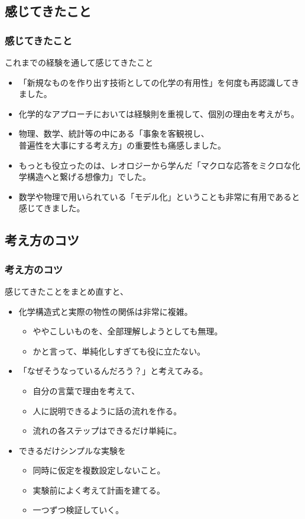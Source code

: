 \documentclass[unicode,12pt]{beamer}%
\begin{document}
\subsection{感じてきたこと}
\begin{frame}
	\frametitle{感じてきたこと}
		\begin{alertblock}{これまでの経験を通して感じてきたこと}
			\begin{itemize}
				\item 「新規なものを作り出す技術としての\alert{化学の有用性}」を何度も再認識してきました。
				\item 化学的なアプローチにおいては経験則を重視して、個別の理由を考えがち。
				\item 物理、数学、統計等の中にある「\alert{事象を客観視し、\\普遍性を大事}にする考え方」の重要性も痛感しました。
				\item もっとも役立ったのは、レオロジーから学んだ「\alert{マクロな応答をミクロな化学構造へと繋げる想像力}」でした。
				\item 数学や物理で用いられている「\alert{モデル化}」ということも非常に有用であると感じてきました。
			\end{itemize}
		\end{alertblock}
\end{frame}

\subsection{考え方のコツ}
\begin{frame}
	\frametitle{考え方のコツ}
		\begin{block}{感じてきたことをまとめ直すと、}
			\begin{itemize}
				\item 化学構造式と実際の物性の関係は非常に複雑。
				\begin{itemize}
					\item ややこしいものを、全部理解しようとしても無理。
					\item かと言って、単純化しすぎても役に立たない。
				\end{itemize}
				\item 「なぜそうなっているんだろう？」と考えてみる。
				\begin{itemize}
					\item 自分の言葉で理由を考えて、
					\item 人に説明できるように話の流れを作る。
					\item 流れの各ステップはできるだけ単純に。
				\end{itemize}
				\item できるだけシンプルな実験を
				\begin{itemize}
					\item 同時に仮定を複数設定しないこと。
					\item 実験前によく考えて計画を建てる。
					\item 一つずつ検証していく。
				\end{itemize}
			\end{itemize}
		\end{block}
\end{frame}
\end{document}
